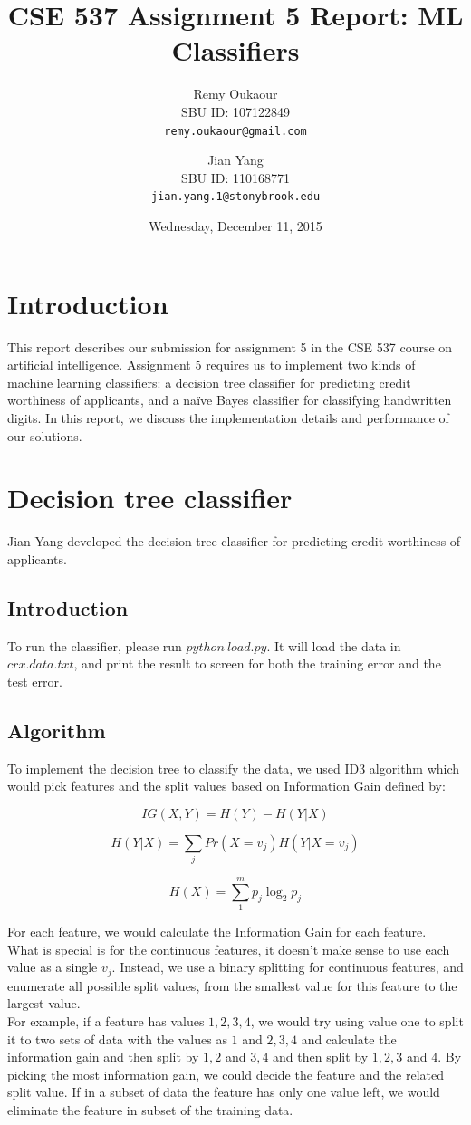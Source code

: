 \documentclass[11pt]{article}
\title{CSE 537 Assignment 5 Report: ML Classifiers}
\author{
Remy Oukaour \\
	{\small SBU ID: 107122849}\\
	{\small \texttt{remy.oukaour@gmail.com}}
\and
Jian Yang \\
	{\small SBU ID: 110168771}\\
	{\small \texttt{jian.yang.1@stonybrook.edu}}
}
\date{Wednesday, December 11, 2015}
\begin{document}
\maketitle

\section{Introduction}

This report describes our submission for assignment 5 in the CSE 537 course on
artificial intelligence. Assignment 5 requires us to implement two kinds of
machine learning classifiers: a decision tree classifier for predicting credit
worthiness of applicants, and a na{\"i}ve Bayes classifier for classifying
handwritten digits. In this report, we discuss the implementation details and
performance of our solutions.

\section{Decision tree classifier}

Jian Yang developed the decision tree classifier for predicting credit worthiness
of applicants.

\subsection{Introduction}

To run the classifier, please run $python\ load.py$. It will load the data in $crx.data.txt$,
and print the result to screen for both the training error and the test error.

\subsection{Algorithm}

To implement the decision tree to classify the data, we used  ID3 algorithm which would pick features
and the split values based on Information Gain defined by:

$$IG(X,Y) = H(Y) - H(Y|X)$$

$$H(Y|X) = \sum_jPr(X=v_j)H(Y|X=v_j)$$

$$H(X) = \sum_{1}^m p_j \log_2{p_j} $$

For each feature, we would calculate the Information Gain for each feature. \\
What is special is for the continuous features, it doesn't make sense to use each value as a single $v_j$.
Instead, we use a binary splitting for continuous features, and enumerate all possible split values, from the smallest value
for this feature to the largest value. \\
For example, if a feature has values $1, 2, 3, 4$, we would try using value one to split it to two sets of data
with the values as $1$ and $2, 3, 4$ and calculate the information gain and then split by $1, 2$ and $3, 4$ and then 
split by $1, 2, 3$ and $4$. By picking the most information gain, we could decide the feature and the related split value.
If in a subset of data the feature has only one value left, we would eliminate the feature in subset of the training data.
\end{document}

